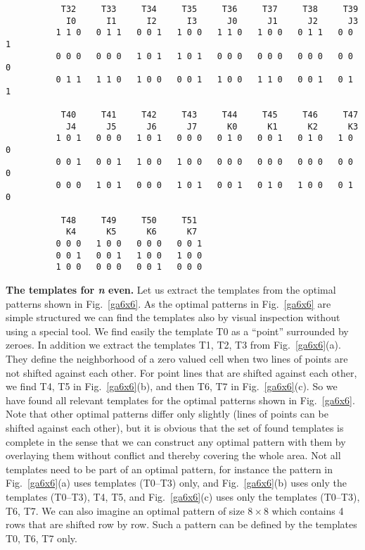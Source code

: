 \documentclass[10pt,a4paper]{article}  %
\begin{document}
\begin{table}[H]
\begin{center}
\begin{verbatim}
           T32     T33     T34     T35     T36     T37     T38     T39
            I0      I1      I2      I3      J0      J1      J2      J3 
          1 1 0   0 1 1   0 0 1   1 0 0   1 1 0   1 0 0   0 1 1   0 0 1                                 
          0 0 0   0 0 0   1 0 1   1 0 1   0 0 0   0 0 0   0 0 0   0 0 0                                 
          0 1 1   1 1 0   1 0 0   0 0 1   1 0 0   1 1 0   0 0 1   0 1 1                                                        
           
           T40     T41     T42     T43     T44     T45     T46     T47
            J4      J5      J6      J7      K0      K1      K2      K3                             
          1 0 1   0 0 0   1 0 1   0 0 0   0 1 0   0 0 1   0 1 0   1 0 0                                
          0 0 1   0 0 1   1 0 0   1 0 0   0 0 0   0 0 0   0 0 0   0 0 0                    
          0 0 0   1 0 1   0 0 0   1 0 1   0 0 1   0 1 0   1 0 0   0 1 0                                                         
                
           T48     T49     T50     T51
            K4      K5      K6      K7         
          0 0 0   1 0 0   0 0 0   0 0 1               
          0 0 1   0 0 1   1 0 0   1 0 0              
          1 0 0   0 0 0   0 0 1   0 0 0                                                          
\end{verbatim}
\end{center}
\label{TableTemplatesEven}
\end{table} 

\textbf{The templates for \textit{n} even.}
Let us extract the templates from the optimal patterns shown in Fig.~\ref{ga6x6}.
As the optimal patterns in Fig.~\ref{ga6x6} are simple structured we can find the templates also by visual inspection
without using a special tool.
We find easily the template T0  as a ``point'' surrounded by zeroes.
In addition we extract the templates T1, T2, T3 from Fig.~\ref{ga6x6}(a).
They define the neighborhood of a zero valued cell when two lines of points are not shifted against each other.
For point lines that are shifted against each other, we find T4, T5 in Fig.~\ref{ga6x6}(b), and  then T6, T7 in Fig.~\ref{ga6x6}(c).
So we have found all relevant templates for the optimal patterns shown in Fig.~\ref{ga6x6}. 
Note that other optimal patterns differ only slightly (lines of points can be shifted against each other),
but it is obvious that the set of found templates is complete in the sense that we can construct
any optimal pattern with them by overlaying them without conflict and thereby covering the whole area. 
Not all templates need to be part of an optimal pattern, for instance the pattern in
Fig.~\ref{ga6x6}(a) uses templates (T0--T3) only, 
and Fig.~\ref{ga6x6}(b) uses only the templates (T0--T3), T4, T5,
and Fig.~\ref{ga6x6}(c) uses only the templates (T0--T3), T6, T7.
We can also imagine an optimal pattern of size $8 \times 8$ which contains 4 rows that are shifted 
row by row. Such a pattern can be defined by the templates T0, T6, T7 only.
\end{document}
